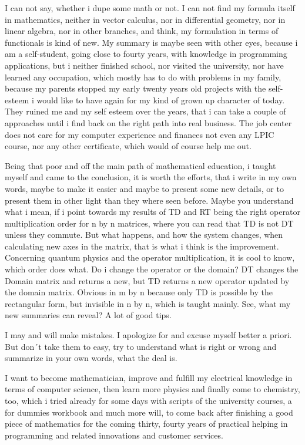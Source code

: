 \documentclass[a4paper]{article}
\begin{document}
I can not say, whether i dupe some math or not. I can not find my formula itself in mathematics, neither in vector calculus,
nor in differential geometry, nor in linear algebra, nor in other branches, and think, my formulation in terms of functionals
is kind of new. My summary is maybe seen with other eyes, because i am a self-student, going close to fourty years, with knowledge
in programming applications, but i neither finished school, nor visited the university, nor have learned any occupation, which mostly has to do with problems in my family, because my parents stopped my early twenty years old projects with the self-esteem i would like to have again for my kind of grown up character of today. They ruined me and my self esteem over the years, that i can take a couple of approaches until i find back on the right path into real business. The job center does not care for my computer experience and finances not even any LPIC course, nor any other certificate, which would of course help me out.

Being that poor and off the main path of mathematical education, i taught myself and came to the conclusion, it is worth the efforts, that i write in my own words, maybe to make it easier and maybe to present some new details, or to present them in other light than they where seen before. Maybe  you understand what i mean, if i point towards my results of TD and RT being the right operator multiplication order for n by n matrices, where you can read that TD is not DT unless they commute. But what happens, and how the system changes, when calculating new axes in the matrix, that is what i think is the improvement. Concerning quantum physics and the operator multiplication, it is cool to know, which order does what. Do i change the operator or the domain? DT changes the Domain matrix and returns a new, but TD returns a new operator updated by the domain matrix. Obvious in m by n because only TD is possible by the rectangular form, but invisible in n by n, which is taught mainly. See, what my new summaries can reveal? A lot of good tips.

I may and will make mistakes. I apologize for and excuse myself better a priori. But don´t take them to easy, try to understand what is right or wrong and summarize in your own words, what the deal is. 

I want to become mathematician, improve and fulfill my electrical knowledge in terms of computer science, then learn more physics and finally come to chemistry, too, which i tried already for some days with scripts of the university courses, a for dummies workbook and much more will, to come back after finishing a good piece of mathematics for the coming thirty, fourty years of practical helping in programming and related innovations and customer services.
\end{document}
